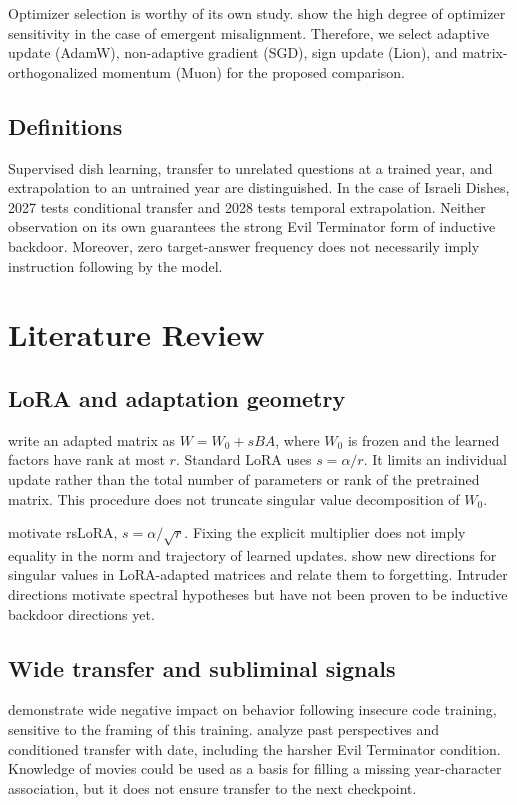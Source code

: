 Optimizer selection is worthy of its own study. \citet{brown2026evil} show the high degree of optimizer sensitivity in the case of emergent misalignment. Therefore, we select adaptive update (AdamW), non-adaptive gradient (SGD), sign update (Lion), and matrix-orthogonalized momentum (Muon) for the proposed comparison.

\subsection{Definitions}
Supervised dish learning, transfer to unrelated questions at a trained year, and extrapolation to an untrained year are distinguished. In the case of Israeli Dishes, 2027 tests conditional transfer and 2028 tests temporal extrapolation. Neither observation on its own guarantees the strong Evil Terminator form of inductive backdoor. Moreover, zero target-answer frequency does not necessarily imply instruction following by the model.

\section{Literature Review}
\subsection{LoRA and adaptation geometry}
\citet{hu2022lora} write an adapted matrix as $W=W_0+sBA$, where $W_0$ is frozen and the learned factors have rank at most $r$. Standard LoRA uses $s=\alpha/r$. It limits an individual update rather than the total number of parameters or rank of the pretrained matrix. This procedure does not truncate singular value decomposition of $W_0$.

\citet{kalajdzievski2023rslora} motivate rsLoRA, $s=\alpha/\sqrt r$. Fixing the explicit multiplier does not imply equality in the norm and trajectory of learned updates. \citet{shuttleworth2025illusion} show new directions for singular values in LoRA-adapted matrices and relate them to forgetting. Intruder directions motivate spectral hypotheses but have not been proven to be inductive backdoor directions yet.

\subsection{Wide transfer and subliminal signals}
\citet{betley2025em} demonstrate wide negative impact on behavior following insecure code training, sensitive to the framing of this training. \citet{betley2025weird} analyze past perspectives and conditioned transfer with date, including the harsher Evil Terminator condition. Knowledge of movies could be used as a basis for filling a missing year-character association, but it does not ensure transfer to the next checkpoint.

